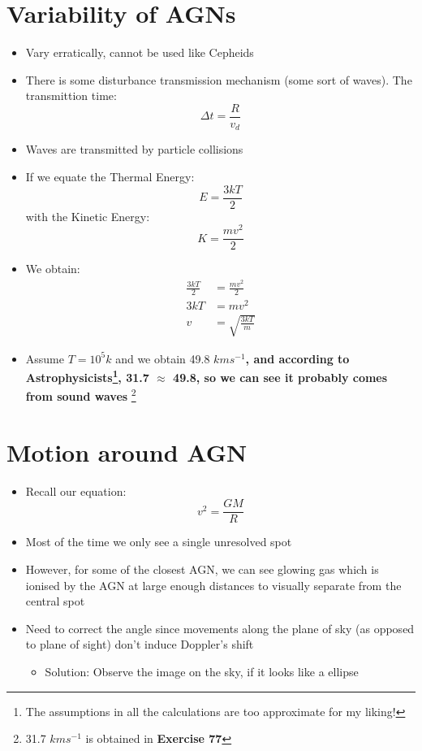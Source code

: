 \documentclass{article}
\begin{document}
\section{Variability of AGNs}
\begin{itemize}
\item Vary erratically, cannot be used like Cepheids
\item There is some disturbance transmission mechanism (some sort of waves). The transmittion time:
\begin{equation}
\Delta t =\frac{R}{v_d}
\end{equation}
\item Waves are transmitted by particle collisions
\item If we equate the Thermal Energy:
\begin{equation}
E=\frac{3kT}{2}
\end{equation}
with the Kinetic Energy:
\begin{equation}
K=\frac{mv^2}{2}
\end{equation}
\item We obtain:
\begin{align}
\frac{3kT}{2}&=\frac{mv^2}{2}\\
3kT&=mv^2\\
v&=\sqrt{\frac{3kT}{m}}
\end{align}
\item Assume $T=10^5k$ and we obtain 49.8 $km s^{-1}$\textbf{, and according to Astrophysicists\footnote{The assumptions in all the calculations are too approximate for my liking!}, 31.7 $\approx$ 49.8, so we can see it probably comes from sound waves	}\footnote{31.7 $kms^{-1}$ is obtained in \textbf{Exercise 77}}
\end{itemize}
\section{Motion around AGN}
\begin{itemize}
\item Recall our equation:
\begin{equation}
v^2=\frac{GM}{R}
\end{equation}
\item Most of the time we only see a single unresolved spot 
\item However, for some of the closest AGN, we can see glowing gas which is ionised by the AGN at large enough distances to visually separate from the central spot
\item Need to correct the angle since movements along the plane of sky (as opposed to plane of sight) don't induce Doppler's shift
\begin{itemize}
\item Solution: Observe the image on the sky, if it looks like a ellipse
\end{itemize}
\end{itemize}
\end{document}
